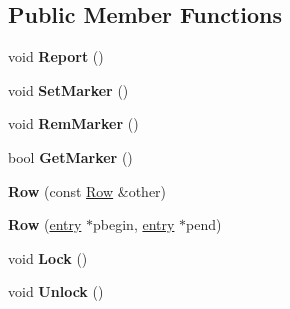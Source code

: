 \subsection*{Public Member Functions}
\begin{DoxyCompactItemize}
\item 
\hypertarget{classINMOST_1_1Solver_1_1Row_a0118f755b9f625a86daec89fb0fd3b10}{void {\bfseries Report} ()}\label{classINMOST_1_1Solver_1_1Row_a0118f755b9f625a86daec89fb0fd3b10}

\item 
\hypertarget{classINMOST_1_1Solver_1_1Row_a636ac5a6d862b93a81706022ba3656bb}{void {\bfseries Set\-Marker} ()}\label{classINMOST_1_1Solver_1_1Row_a636ac5a6d862b93a81706022ba3656bb}

\item 
\hypertarget{classINMOST_1_1Solver_1_1Row_a21da67468799355d250d8b9a1203303a}{void {\bfseries Rem\-Marker} ()}\label{classINMOST_1_1Solver_1_1Row_a21da67468799355d250d8b9a1203303a}

\item 
\hypertarget{classINMOST_1_1Solver_1_1Row_affe6afd6d1360741bbda3da9ece864ca}{bool {\bfseries Get\-Marker} ()}\label{classINMOST_1_1Solver_1_1Row_affe6afd6d1360741bbda3da9ece864ca}

\item 
\hypertarget{classINMOST_1_1Solver_1_1Row_aab8578ccd5366204ee4db2bd0350dbf4}{{\bfseries Row} (const \hyperlink{classINMOST_1_1Solver_1_1Row}{Row} \&other)}\label{classINMOST_1_1Solver_1_1Row_aab8578ccd5366204ee4db2bd0350dbf4}

\item 
\hypertarget{classINMOST_1_1Solver_1_1Row_ada200daf944fd240ec23d41c8dd9b0c1}{{\bfseries Row} (\hyperlink{classINMOST_1_1Solver_1_1Row_a83f9b826189f21abd7ad395608901825}{entry} $\ast$pbegin, \hyperlink{classINMOST_1_1Solver_1_1Row_a83f9b826189f21abd7ad395608901825}{entry} $\ast$pend)}\label{classINMOST_1_1Solver_1_1Row_ada200daf944fd240ec23d41c8dd9b0c1}

\item 
\hypertarget{classINMOST_1_1Solver_1_1Row_aefcfbbcf45bb6ac91990c3814d87ef6d}{void {\bfseries Lock} ()}\label{classINMOST_1_1Solver_1_1Row_aefcfbbcf45bb6ac91990c3814d87ef6d}

\item 
\hypertarget{classINMOST_1_1Solver_1_1Row_ac2945647b3ab8a2e6fcbcf148175056d}{void {\bfseries Unlock} ()}\label{classINMOST_1_1Solver_1_1Row_ac2945647b3ab8a2e6fcbcf148175056d}


\end{DoxyCompactItemize}
